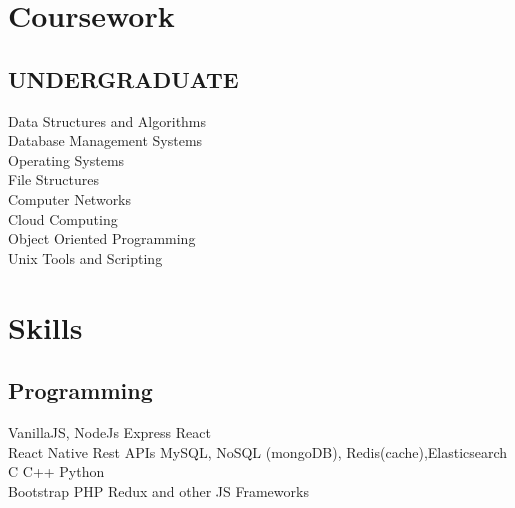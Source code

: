 \documentclass[]{deedy-resume-openfont}
\begin{document}
\begin{minipage}[t]{0.33\textwidth}

\section{Coursework}
\subsection{UNDERGRADUATE}
Data Structures and Algorithms\\
Database Management Systems\\
Operating Systems\\
File Structures\\
Computer Networks\\
Cloud Computing\\
Object Oriented Programming\\
Unix Tools and Scripting\\
\sectionsep


\section{Skills}
\subsection{Programming}
VanillaJS, NodeJs \textbullet{} Express \textbullet{} 
React \\ \textbullet{} React Native \textbullet{} Rest APIs
\textbullet{} MySQL, NoSQL (mongoDB),
Redis(cache),Elasticsearch 
\textbullet{} C \textbullet{} C++ \textbullet{} Python\\
\textbullet{} Bootstrap \textbullet{} PHP
\textbullet{} Redux and other JS Frameworks
\sectionsep

%
%

\end{minipage} 
\hfill
\end{document}
